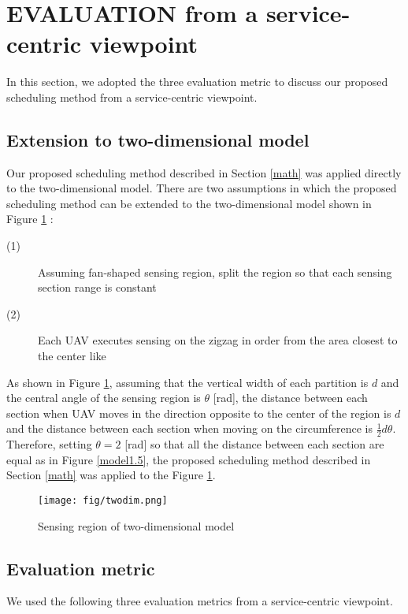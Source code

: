 \documentclass{ieeeaccess}
\begin{document}
\section{EVALUATION from a service-centric viewpoint}
In this section, we adopted the three evaluation metric to discuss our proposed scheduling method from a service-centric viewpoint.
\subsection{Extension to two-dimensional model}\label{twodi}
Our proposed scheduling method described in Section \ref{math} was applied directly to the two-dimensional model.
There are two assumptions in which the proposed scheduling method can be extended to the two-dimensional model shown in Figure \ref{twodimention} :

\begin{description}

\item[(1)]  Assuming fan-shaped sensing region, split the region so that each sensing section range is constant
\item[(2)] Each UAV executes sensing on the zigzag in order from the area closest to the center like \cite{Maza2007}
\end{description}

As shown in Figure \ref{twodimention}, assuming that the vertical width of each partition is $d$ and the central angle of the sensing region is $\theta$ [rad], the distance between each section when UAV moves in the direction opposite to the center of the region is $d$ and the distance between each section when moving on the circumference is $\frac{1}{2}d\theta$.
Therefore, setting $\theta=2$ [rad] so that all the distance between each section are equal as in Figure \ref{model1.5}, the proposed scheduling method described in Section \ref{math} was applied to the Figure \ref{twodimention}.

\begin{figure}[t]
\begin{center}
\texttt{[image: fig/twodim.png]}
\caption{Sensing region of two-dimensional model}
\label{twodimention}
\end{center}
\end{figure}

\subsection{Evaluation metric}\label{compare}
We used the following three evaluation metrics from a service-centric viewpoint.
\end{document}
